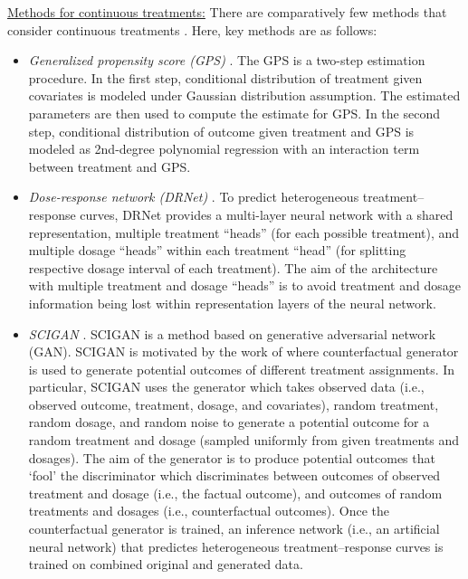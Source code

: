 \documentclass[sigconf]{acmart}
\begin{document}
\vspace{0.25cm}
\noindent
\underline{Methods for continuous treatments:} There are comparatively few methods that consider continuous treatments \cite{Hirano2004, Schwab2020, Bica2020}. Here, key methods are as follows: 
\begin{itemize}
\item \emph{Generalized propensity score (GPS)} \cite{Hirano2004}. The GPS is a two-step estimation procedure. In the first step, conditional distribution of treatment given covariates is modeled under Gaussian distribution assumption. The estimated parameters are then used to compute the estimate for GPS. In the second step, conditional distribution of outcome given treatment and GPS is modeled as 2nd-degree polynomial regression with an interaction term between treatment and GPS.
\item \emph{Dose-response network (DRNet)} \cite{Schwab2020}. To predict heterogeneous treatment--response curves, DRNet provides a multi-layer neural network with a shared representation, multiple treatment ``heads'' (for each possible treatment), and multiple dosage ``heads'' within each treatment ``head'' (for splitting respective dosage interval of each treatment). The aim of the architecture with multiple treatment and dosage ``heads'' is to avoid treatment and dosage information being lost within representation layers of the neural network.
\item \emph{SCIGAN} \cite{Bica2020}. SCIGAN is a method based on generative adversarial network (GAN). SCIGAN is motivated by the work of \cite{Yoon2018} where counterfactual generator is used to generate potential outcomes of different treatment assignments. In particular, SCIGAN uses the generator which takes observed data (i.e., observed outcome, treatment, dosage, and covariates), random treatment, random dosage, and random noise to generate a potential outcome for a random treatment and dosage (sampled uniformly from given treatments and dosages). The aim of the generator is to produce potential outcomes that `fool' the discriminator which discriminates between outcomes of observed treatment and dosage (i.e., the factual outcome), and outcomes of random treatments and dosages (i.e., counterfactual outcomes). Once the counterfactual generator is trained, an inference network (i.e., an artificial neural network) that predictes heterogeneous treatment--response curves is trained on combined original and generated data.

\end{itemize}
\end{document}
